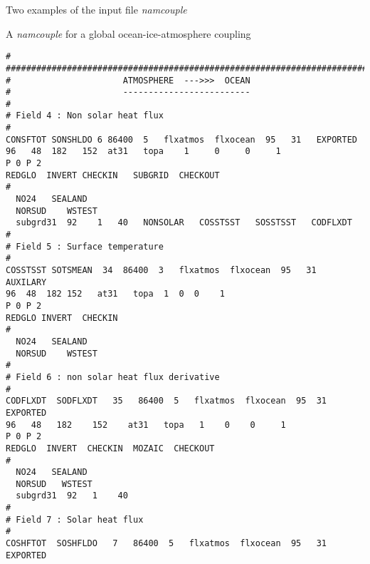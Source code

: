 \begin{section}{Two examples of the input file {\em namcouple}}
\begin{subsection}{A {\em namcouple} for a global ocean-ice-atmosphere coupling}
\begin{verbatim}
#                                                                       
########################################################################
#                      ATMOSPHERE  --->>>  OCEAN                        
#                      -------------------------                        
#                                                                       
# Field 4 : Non solar heat flux                                         
#                                                                       
CONSFTOT SONSHLDO 6 86400  5   flxatmos  flxocean  95   31   EXPORTED   
96   48  182   152  at31   topa    1     0     0     1  
P 0 P 2                  
REDGLO  INVERT CHECKIN   SUBGRID  CHECKOUT                             
#                                                                       
  NO24   SEALAND                                                           
  NORSUD    WSTEST                                                        
  subgrd31  92    1   40   NONSOLAR   COSSTSST   SOSSTSST   CODFLXDT    
#                                                                       
# Field 5 : Surface temperature                                         
#                                                                       
COSSTSST SOTSMEAN  34  86400  3   flxatmos  flxocean  95   31  AUXILARY 
96  48  182 152   at31   topa  1  0  0    1
P 0 P 2                               
REDGLO INVERT  CHECKIN                                               
#                                                                       
  NO24   SEALAND                                                           
  NORSUD    WSTEST 
#                                                                       
# Field 6 : non solar heat flux derivative                              
#                                                                       
CODFLXDT  SODFLXDT   35   86400  5   flxatmos  flxocean  95  31  EXPORTED
96   48   182    152    at31   topa   1    0    0     1   
P 0 P 2               
REDGLO  INVERT  CHECKIN  MOZAIC  CHECKOUT                              
#
  NO24   SEALAND                                                           
  NORSUD   WSTEST                                                         
  subgrd31  92   1    40                                                  
#                                                                       
# Field 7 : Solar heat flux                                             
#                                                                       
COSHFTOT  SOSHFLDO   7   86400  5   flxatmos  flxocean  95   31  EXPORTED

\end{verbatim}
\end{subsection}
\end{section}
